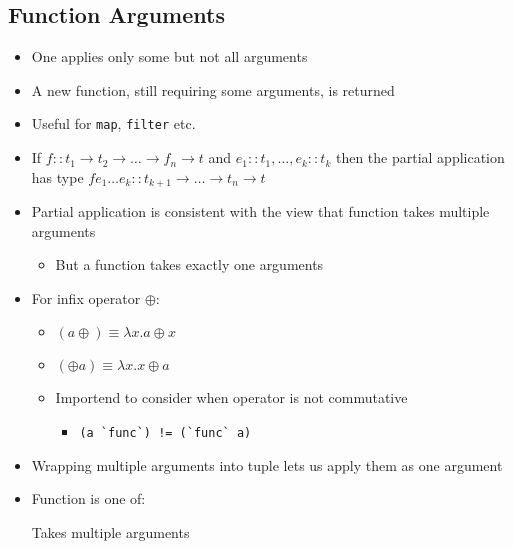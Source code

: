 \subsection{Function Arguments}
\begin{itemize}
        \begin{itemize}
            \item One applies only some but not all arguments
            \item A new function, still requiring some arguments, is returned
            \item Useful for \verb+map+, \verb+filter+ etc.
            \item If $f :: t_1 \to t_2 \to \dots \to f_n \to t$ and $e_1 :: t_1, \dots , e_k :: t_k$ then the partial application has type $f e_1 \dots e_k :: t_{k + 1} \to \dots \to t_n \to t$
            \item Partial application is consistent with the view that function takes multiple arguments
                \begin{itemize}
                    \item But a function takes exactly one arguments
                \end{itemize}
            \item For infix operator $\oplus$:
                \begin{itemize}
                    \item $(a \oplus) \equiv \lambda x. a \oplus x$
                    \item $(\oplus a) \equiv \lambda x. x \oplus a$
                    \item Importend to consider when operator is not commutative
                        \begin{itemize}
                            \item \verb+(a `func`) != (`func` a)+
                        \end{itemize}
                \end{itemize}
        \end{itemize}
        \begin{itemize}
            \item Wrapping multiple arguments into tuple lets us apply them as one argument
            \item Function is one of:
                \begin{itemize}
                     Takes multiple arguments

\end{itemize}
\end{itemize}
\end{itemize}
